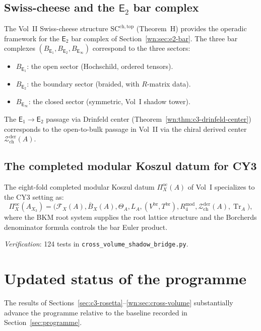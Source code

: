 \documentclass[11pt]{article}
\newcommand{\cF}{\mathcal{F}}
\newcommand{\cZ}{\mathcal{Z}}
\newcommand{\Eone}{\mathsf{E}_1}
\newcommand{\Etwo}{\mathsf{E}_2}
\newcommand{\Einf}{\mathsf{E}_{\infty}}
\newcommand{\Tr}{\operatorname{Tr}}
\begin{document}
\subsection{Swiss-cheese and the $\Etwo$ bar complex}
\label{wn:subsec:cross-vol-sc}

The Vol~II Swiss-cheese structure $\mathrm{SC}^{\mathrm{ch,top}}$ (Theorem~H) provides the operadic framework for the $\Etwo$ bar complex of Section~\ref{wn:sec:e2-bar}. The three bar complexes $(B_{\Eone}, B_{\Etwo}, B_{\Einf})$ correspond to the three sectors:
\begin{itemize}
 \item $B_{\Eone}$: the open sector (Hochschild, ordered tensors).
 \item $B_{\Etwo}$: the boundary sector (braided, with $R$-matrix data).
 \item $B_{\Einf}$: the closed sector (symmetric, Vol~I shadow tower).
\end{itemize}
The $\Eone \to \Etwo$ passage via Drinfeld center (Theorem~\ref{wn:thm:c3-drinfeld-center}) corresponds to the open-to-bulk passage in Vol~II via the chiral derived center $\cZ^{\mathrm{der}}_{\mathrm{ch}}(A)$.

\subsection{The completed modular Koszul datum for CY3}
\label{wn:subsec:cross-vol-mkd}

The eight-fold completed modular Koszul datum $\Pi^{\mathrm{oc}}_X(A)$ of Vol~I specializes to the CY3 setting as:
\[
 \Pi^{\mathrm{oc}}_{X}(A_{X_3}) = \bigl(\cF_X(A), \overline{B}_X(A), \Theta_A, L_A, (V^{\mathrm{br}}, T^{\mathrm{br}}), R^{\mathrm{mod}}_4, \cZ^{\mathrm{der}}_{\mathrm{ch}}(A), \Tr_A\bigr),
\]
where the BKM root system supplies the root lattice structure and the Borcherds denominator formula controls the bar Euler product.

\noindent\textit{Verification}: 124 tests in \texttt{cross\_volume\_shadow\_bridge.py}.


\section{Updated status of the programme}
\label{sec:updated-status}

The results of Sections~\ref{sec:c3-rosetta}--\ref{wn:sec:cross-volume} substantially advance the programme relative to the baseline recorded in Section~\ref{sec:programme}.
\end{document}
